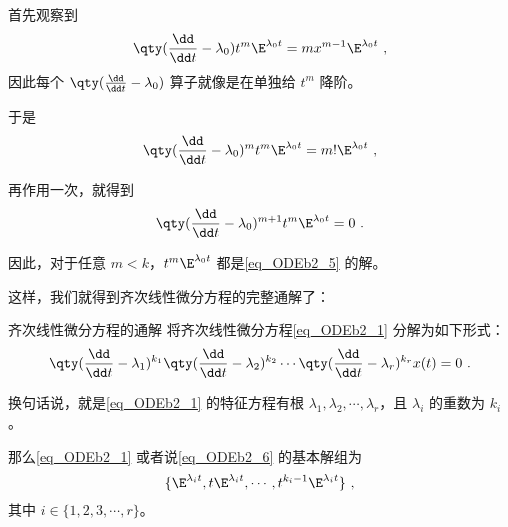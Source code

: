 首先观察到
\begin{equation}
\qty(\frac{\dd}{\dd t}-\lambda_0)t^m\E^{\lambda_0 t}=mx^{m-1}\E^{\lambda_0 t}~,
\end{equation}
因此每个 $\qty(\frac{\dd}{\dd t}-\lambda_0)$ 算子就像是在单独给 $t^m$ 降阶。

于是
\begin{equation}
\qty(\frac{\dd}{\dd t}-\lambda_0)^mt^m\E^{\lambda_0 t}=m!\E^{\lambda_0 t}~,
\end{equation}

再作用一次，就得到
\begin{equation}
\qty(\frac{\dd}{\dd t}-\lambda_0)^{m+1}t^m\E^{\lambda_0 t}=0~.
\end{equation}

因此，对于任意 $m<k$，$t^m\E^{\lambda_0 t}$ 都是\autoref{eq_ODEb2_5} 的解。

这样，我们就得到齐次线性微分方程的完整通解了：

\begin{theorem}{齐次线性微分方程的通解}
将齐次线性微分方程\autoref{eq_ODEb2_1} 分解为如下形式：
\begin{equation}\label{eq_ODEb2_6}
\qty(\frac{\dd}{\dd t}-\lambda_1)^{k_1}\qty(\frac{\dd}{\dd t}-\lambda_2)^{k_2}\cdots\qty(\frac{\dd}{\dd t}-\lambda_r)^{k_r}x(t)=0~.
\end{equation}

换句话说，就是\autoref{eq_ODEb2_1} 的特征方程有根 $\lambda_1, \lambda_2, \cdots, \lambda_r$，且 $\lambda_i$ 的重数为 $k_i$。

那么\autoref{eq_ODEb2_1} 或者说\autoref{eq_ODEb2_6} 的基本解组为
\begin{equation}
\{
    \E^{\lambda_i t}, t\E^{\lambda_i t}, \cdots, t^{k_i-1}\E^{\lambda_i t}
\}~,
\end{equation}
其中 $i\in\{1, 2, 3, \cdots, r\}$。



\end{theorem}









